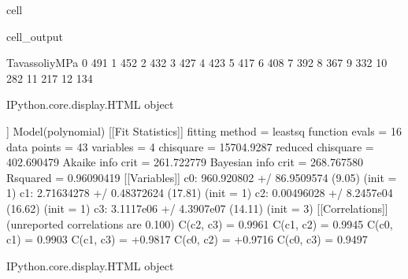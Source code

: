 \documentclass[letterpaper,10pt,english]{jupyterBook}
\begin{document}
\begin{sphinxuseclass}{cell}
\begin{sphinxVerbatimOutput}
\begin{sphinxuseclass}{cell_output}
\begin{sphinxVerbatim}[commandchars=\\\{\}]
					Tavassoli\PYGZus{}yMPa  
					0              491  
					1              452  
					2              432  
					3              427  
					4              423  
					5              417  
					6              408  
					7              392  
					8              367  
					9              332  
					10             282  
					11             217  
					12             134  
				\end{sphinxVerbatim}
				
				\begin{sphinxVerbatim}[commandchars=\\\{\}]
					\PYGZlt{}IPython.core.display.HTML object\PYGZgt{}
				\end{sphinxVerbatim}
				
				\sphinxAtStartPar
				
				\begin{sphinxVerbatim}[commandchars=\\\{\}]
					[[Model]]
					Model(polynomial)
					[[Fit Statistics]]
					\PYGZsh{} fitting method   = leastsq
					\PYGZsh{} function evals   = 16
					\PYGZsh{} data points      = 43
					\PYGZsh{} variables        = 4
					chi\PYGZhy{}square         = 15704.9287
					reduced chi\PYGZhy{}square = 402.690479
					Akaike info crit   = 261.722779
					Bayesian info crit = 268.767580
					R\PYGZhy{}squared          = 0.96090419
					[[Variables]]
					c0:  960.920802 +/\PYGZhy{} 86.9509574 (9.05\PYGZpc{}) (init = 1)
					c1: \PYGZhy{}2.71634278 +/\PYGZhy{} 0.48372624 (17.81\PYGZpc{}) (init = 1)
					c2:  0.00496028 +/\PYGZhy{} 8.2457e\PYGZhy{}04 (16.62\PYGZpc{}) (init = 1)
					c3: \PYGZhy{}3.1117e\PYGZhy{}06 +/\PYGZhy{} 4.3907e\PYGZhy{}07 (14.11\PYGZpc{}) (init = 3)
					[[Correlations]] (unreported correlations are \PYGZlt{} 0.100)
					C(c2, c3) = \PYGZhy{}0.9961
					C(c1, c2) = \PYGZhy{}0.9945
					C(c0, c1) = \PYGZhy{}0.9903
					C(c1, c3) = +0.9817
					C(c0, c2) = +0.9716
					C(c0, c3) = \PYGZhy{}0.9497
				\end{sphinxVerbatim}
				
				\begin{sphinxVerbatim}[commandchars=\\\{\}]
					\PYGZlt{}IPython.core.display.HTML object\PYGZgt{}
				\end{sphinxVerbatim}
				

\end{sphinxuseclass}
\end{sphinxVerbatimOutput}
\end{sphinxuseclass}
\end{document}
